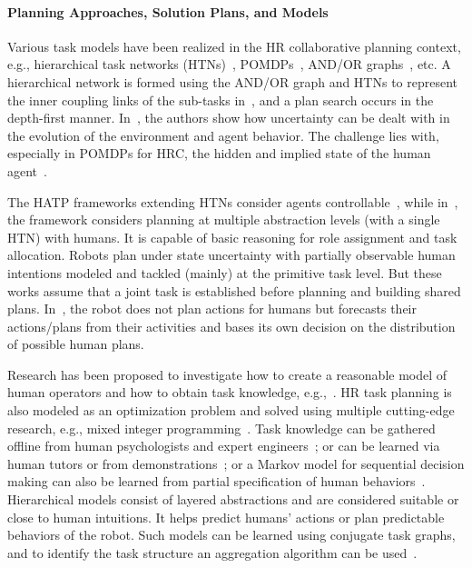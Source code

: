 \documentclass[letterpaper]{article} %
\begin{document}
\paragraph{Planning Approaches, Solution Plans, and Models}
Various task models have been realized in the HR collaborative planning context, e.g., hierarchical task networks (HTNs)~\cite{lallement2018hatp,roncone2017transparent}, POMDPs~\cite{UnhelkarLS19,roncone2017transparent,UnhelkarLS20}, AND/OR graphs~\cite{DarvishSMC21}, etc.
A hierarchical network is formed using the AND/OR graph and HTNs to represent the inner coupling links of the sub-tasks in~\cite{GombolayJSSS16}, and a plan search occurs in the depth-first manner. In~\cite{HorgerKE19}, the authors show how uncertainty can be dealt with in the evolution of the environment and agent behavior. The challenge lies with, especially in POMDPs for HRC, the hidden and implied state of the human agent~\cite{UnhelkarLS20}.

The HATP frameworks extending HTNs consider agents controllable~\cite{alami2006toward,lallement2018hatp}, while in~\cite{roncone2017transparent}, the framework considers planning at multiple abstraction levels (with a single HTN) with humans. 
It is capable of basic reasoning for role assignment and task allocation. Robots plan under state uncertainty with partially observable human intentions modeled and tackled (mainly) at the primitive task level. But these works assume that a joint task is established before planning and building shared plans. In~\cite{CirilloKS09}, the robot does not plan actions for humans but forecasts their actions/plans from their activities and bases its own decision on the distribution of possible human plans.

Research has been proposed to investigate how to create a reasonable model of human operators and how to obtain task knowledge, e.g.,~\cite{unhelkar2019learning}. 
HR task planning is also modeled as an optimization problem and solved using multiple cutting-edge research, e.g., mixed integer programming~\cite{VatsKL22}. 
Task knowledge can be gathered offline from human psychologists and expert engineers~\cite{levine2014concurrent,wang2018robot,CirilloKS09}; or can be learned via human tutors or from demonstrations~\cite{koppula2016anticipatory}; or a Markov model for sequential decision making can also be learned from partial specification of human behaviors~\cite{unhelkar2019learning}. 
% 
Hierarchical models consist of layered abstractions and are considered suitable or close to human intuitions. It helps predict humans' actions or plan predictable behaviors of the robot. 
Such models can be learned using conjugate task graphs, and to identify the task structure an aggregation algorithm can be used~\cite{HayesS16}. 
\end{document}
